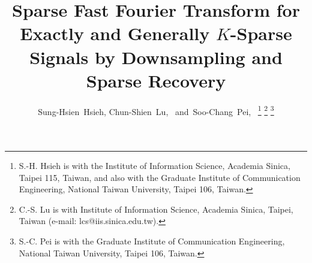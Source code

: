 \documentclass[journal,onecolumn,11pt]{IEEEtran}
\begin{document}
\title{ Sparse Fast Fourier Transform for Exactly and Generally $K$-Sparse Signals by Downsampling and Sparse Recovery}
\author{Sung-Hsien~Hsieh,
        Chun-Shien~Lu,~
        and~Soo-Chang~Pei,~ \thanks{S.-H. Hsieh is with the Institute of Information Science, Academia Sinica,
Taipei 115, Taiwan, and also with the Graduate Institute of Communication Engineering, National Taiwan University, Taipei 106, Taiwan.}
\thanks{C.-S. Lu is with Institute of Information Science, Academia Sinica, Taipei,
Taiwan (e-mail: lcs@iis.sinica.edu.tw).}
\thanks{S.-C. Pei is with the Graduate Institute of Communication Engineering,
National Taiwan University, Taipei 106, Taiwan.}
}


\markboth{}{}



\maketitle
\end{document}
